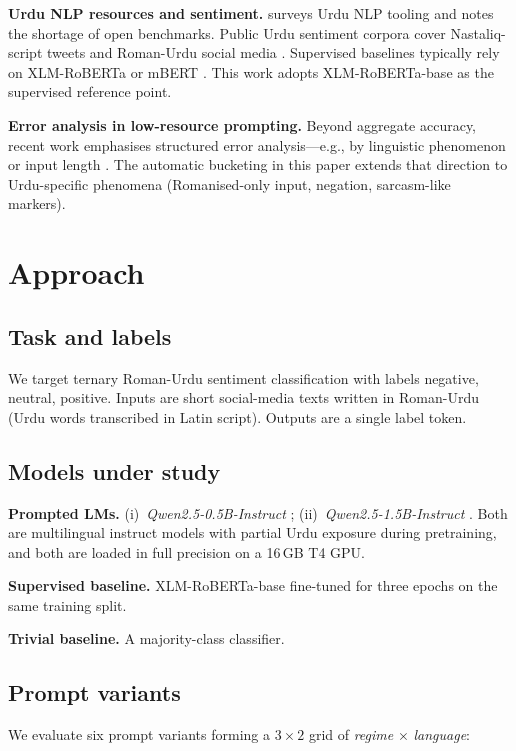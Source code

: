 \documentclass[conference]{IEEEtran}
\begin{document}
\textbf{Urdu NLP resources and sentiment.}
\cite{urdusurvey2023} surveys Urdu NLP tooling and notes the shortage of
open benchmarks. Public Urdu sentiment corpora cover Nastaliq-script
tweets \cite{urdusent2022} and Roman-Urdu social media \cite{romanurdu2023}.
Supervised baselines typically rely on XLM-RoBERTa
\cite{conneau2020unsupervised} or mBERT \cite{devlin2019bert}. This work
adopts XLM-RoBERTa-base as the supervised reference point.

\textbf{Error analysis in low-resource prompting.}
Beyond aggregate accuracy, recent work emphasises structured error
analysis---e.g., by linguistic phenomenon or input length
\cite{min2022rethinking}. The automatic bucketing in this paper extends
that direction to Urdu-specific phenomena (Romanised-only input, negation,
sarcasm-like markers).

\section{Approach}

\subsection{Task and labels}
We target ternary Roman-Urdu sentiment classification with labels
\textsf{negative}, \textsf{neutral}, \textsf{positive}. Inputs are
short social-media texts written in Roman-Urdu (Urdu words transcribed
in Latin script). Outputs are a single label token.

\subsection{Models under study}
\textbf{Prompted LMs.}
(i)~\textit{Qwen2.5-0.5B-Instruct} \cite{qwen25};
(ii)~\textit{Qwen2.5-1.5B-Instruct} \cite{qwen25}.
Both are multilingual instruct models with partial Urdu exposure during
pretraining, and both are loaded in full precision on a 16\,GB T4 GPU.

\textbf{Supervised baseline.} XLM-RoBERTa-base \cite{conneau2020unsupervised}
fine-tuned for three epochs on the same training split.

\textbf{Trivial baseline.} A majority-class classifier.

\subsection{Prompt variants}
We evaluate six prompt variants forming a $3 \times 2$ grid of
\emph{regime} $\times$ \emph{language}:
\end{document}
